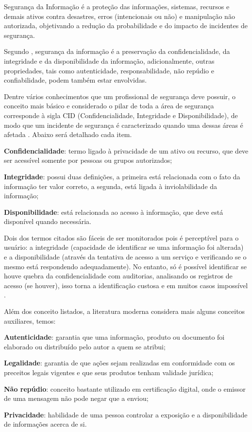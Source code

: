 Segurança da Informação é a proteção das informações, sistemas, recursos e demais ativos contra desastres, erros (intencionais ou não) e manipulação não autorizada, objetivando a redução da probabilidade e do impacto de incidentes de segurança.

Segundo \cite{isoiec27002}, segurança da informação é a preservação da confidencialidade, da integridade e da disponibilidade da informação, adicionalmente, outras propriedades, tais como autenticidade, responsabilidade, não repúdio e confiabilidade, podem também estar envolvidas.

Dentre vários conhecimentos que um profissional de segurança deve possuir, o conceito mais básico e considerado o pilar de toda a área de segurança corresponde à sigla CID (Confidencialidade, Integridade e Disponibilidade), de modo que um incidente de segurança é caracterizado quando uma dessas áreas é afetada \cite{seg-redes-sistemas}. Abaixo será detalhado cada item.

\begin{alineas}
 \item \textbf{Confidencialidade}: termo ligado à privacidade de um ativo ou recurso, que deve ser acessível somente por pessoas ou grupos autorizados;
 \item \textbf{Integridade}: possui duas definições, a primeira está relacionada com o fato da informação ter valor correto, a segunda, está ligada à inviolabilidade da informação;
 \item \textbf{Disponibilidade}: está relacionada ao acesso à informação, que deve está disponível quando necessária.
\end{alineas}

Dois dos termos citados são fáceis de ser monitorados pois é perceptível para o usuário: a integridade (capacidade de identificar se uma informação foi alterada) e a disponibilidade (através da tentativa de acesso a um serviço e verificando se o mesmo está respondendo adequadamente). No entanto, só é possível identificar se houve quebra da confidencialidade com auditorias, analisando os registros de acesso (se houver), isso torna a identificação custosa e em muitos casos impossível \cite{seg-redes-sistemas}.

Além dos conceito listados, a literatura moderna considera mais alguns conceitos auxiliares, temos:

\begin{alineas}
 \item \textbf{Autenticidade}: garantia que uma informação, produto ou documento foi elaborado ou distribuído pelo autor a quem se atribui;
 \item \textbf{Legalidade}: garantia de que ações sejam realizadas em conformidade com os preceitos legais vigentes e que seus produtos tenham validade jurídica;
 \item \textbf{Não repúdio}: conceito bastante utilizado em certificação digital, onde o emissor de uma mensagem não pode negar que a enviou;
 \item \textbf{Privacidade}: habilidade de uma pessoa controlar a exposição e a disponibilidade de informações acerca de si.
\end{alineas}

